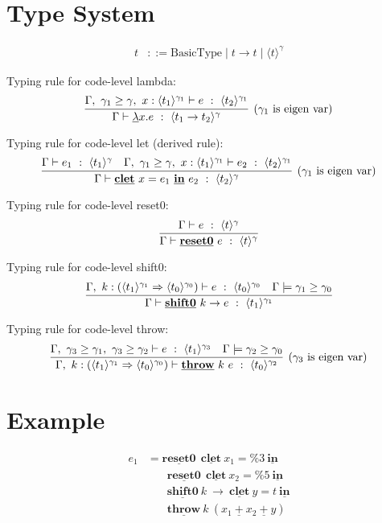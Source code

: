 \documentclass[10pt,a4j]{jarticle}
\newcommand\cfun[2]{\underline{\lambda}{#1}.{#2}}
\newcommand\cResetz{\underline{\textbf{reset0}}}
\newcommand\cShiftz{\underline{\textbf{shift0}}}
\newcommand\cThrow{\underline{\textbf{throw}}}
\newcommand\cresetz[1]{\cResetz~{#1}}
\newcommand\cshiftz[2]{\cShiftz~{#1}\to{#2}}
\newcommand\cthrow[2]{\cThrow~{#1}~{#2}}
\newcommand\cPlus{\underline{\textbf{+}}}
\newcommand\cLet{\underline{\textbf{clet}}}
\newcommand\cIn{\underline{\textbf{in}}}
\newcommand\clet[3]{\cLet~{#1}={#2}~\cIn~{#3}}
\newcommand\csp[1]{\texttt{\%}{#1}}
\newcommand\codeT[2]{\langle{#1}\rangle^{#2}}
\newcommand\contT[2]{({#1} \Rightarrow {#2})}
\newcommand\ord{\ge}
\begin{document}
\section{Type System}

\begin{align*}
  t & ::= \textrm{BasicType} \mid t \to t \mid \codeT{t}{\gamma}
\end{align*}

Typing rule for code-level lambda:
\[
  \infer[(\gamma_1~\text{is eigen var})]
  {\Gamma \vdash \cfun{x}{e} ~:~ \codeT{t_1\to t_2}{\gamma}}
  {\Gamma,~\gamma_1 \ord \gamma,~x:\codeT{t_1}{\gamma_1} \vdash e
    ~:~ \codeT{t_2}{\gamma_1}}
\]

Typing rule for code-level let (derived rule):
\[
  \infer[(\gamma_1~\text{is eigen var})]
  {\Gamma \vdash \clet{x}{e_1}{e_2} ~:~ \codeT{t_2}{\gamma}}
  {\Gamma \vdash e_1 ~:~ \codeT{t_1}{\gamma}
    &\Gamma,~\gamma_1 \ord \gamma,~x:\codeT{t_1}{\gamma_1} \vdash
    e_2 ~:~ \codeT{t_2}{\gamma_1}
  }
\]

Typing rule for code-level reset0:
\[
  \infer{\Gamma \vdash \cresetz{e} ~:~ \codeT{t}{\gamma}}
  {\Gamma \vdash e ~:~ \codeT{t}{\gamma}}
\]

Typing rule for code-level shift0:
\[
  \infer{\Gamma \vdash \cshiftz{k}{e} ~:~ \codeT{t_1}{\gamma_1}}
  {\Gamma,~k:\contT{\codeT{t_1}{\gamma_1}}{\codeT{t_0}{\gamma_0}}
    \vdash e ~:~ \codeT{t_0}{\gamma_0}
    & \Gamma \models \gamma_1 \ord \gamma_0
  }
\]

Typing rule for code-level throw:
\[
  \infer[(\gamma_3~\text{is eigen var})]
  {\Gamma,~k:\contT{\codeT{t_1}{\gamma_1}}{\codeT{t_0}{\gamma_0}}
    \vdash \cthrow{k}{e} ~:~ \codeT{t_0}{\gamma_2}}
  {\Gamma,~
    \gamma_3 \ord \gamma_1,~
    \gamma_3 \ord \gamma_2
    \vdash e ~:~ \codeT{t_1}{\gamma_3}
    & \Gamma \models \gamma_2 \ord \gamma_0
  }
\]


\section{Example}

\begin{align*}
  e_1 & = \cResetz ~~\cLet~x_1=\csp{3}~\cIn \\
      & \phantom{=}~~ \cResetz ~~\cLet~x_2=\csp{5}~\cIn \\
      & \phantom{=}~~ \cShiftz~k~\to~\cLet~y=t~\cIn \\
      & \phantom{=}~~ \cThrow~k~(x_1~\cPlus~x_2~\cPlus~y)
\end{align*}
\end{document}
